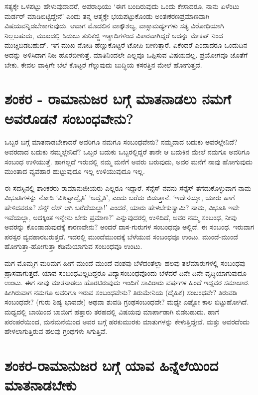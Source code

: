 ಸತ್ಯಕ್ಕೇ ಒಳಪಟ್ಟು ಹೇಳುವುದಾದರೆ, ಅಪರಾಧಿಯು `ಈಗ ಬಂದಿರುವುದು ಒಂದು ಕೇಸಾದರೂ, ನಾನು ಏಳೆಂಟು ಮರ್ಡರ್ ಮಾಡಿಬಿಟ್ಟಿದ್ದೇನೆ' ಎಂದು ತನ್ನ ಆತ್ಮಕ್ಕೇ ಭಯಪಟ್ಟುಕೊಂಡು ಅಂತಃಕರಣಪ್ರಮಾಣವಾಗಿ ವಿಷಯವನ್ನಿಡಬೇಕಾಗುವುದು. ಆವಾಗ ಮೊದಲಿನ ವಾಕ್ಕೌಶಲ್ಯ, ವಾಕ್ಸಾಮರ್ಥ್ಯಗಳು ಸತ್ಯ ವಿರೋಧಿಯಾಗಿ ನಿಲ್ಲಬಹುದು, ಮುಖದಲ್ಲಿ ಸಿಡುಬು ತುರಿಕಜ್ಜಿ ಇತ್ಯಾದಿಗಳಿಂದ ವಿಕಾರವಾಗಿದ್ದರೆ ಅದನ್ನು ಮೇಕಪ್ ನಿಂದ ಮುಚ್ಚಿಬಿಡಬಹುದ್. ಇಗ ಮುಖ ನೋಡಿ ಹೆಣ್ಣುಕೊಟ್ಟರೆ ಟೋಪಿ ಬೀಳುತ್ತಾರೆ. ಏಕೆಂದರೆ ಎಂದಾದರೂ ಒಂದುದಿನ ಅದನ್ನು ಅಳಿಸಿದಾಗ ನಿಜ ಹೊರಬೀಳುತ್ತೆ. ಮಾತಿನಿಂದಲೇ ಎಲ್ಲವೂ ಒಪ್ಪಿಸುವ ವಿಷಯವಲ್ಲ. ಪ್ರಯೋಗವೂ ಜೊತೆಗೆ ಬೇಕು. ಕೇವಲ ವಾಕ್ಕಿಗೇ ಬೆಲೆ ಕೊಟ್ಟರೆ ಗೆಲ್ಲುವುದು ಬುದ್ಧಿಯ ಕಸರತ್ತಿನ ಮೇಲೆ ಹೋಗುತ್ತದೆ.

\section*{ಶಂಕರ - ರಾಮಾನುಜರ ಬಗ್ಗೆ ಮಾತನಾಡಲು ನಮಗೆ ಅವರೊಡನೆ ಸಂಬಂಧವೇನು?}

ಒಬ್ಬರ ಬಗ್ಗೆ ಮಾತನಾಡಬೇಕಾದರೆ ಅವರಿಗೂ ನಮಗೂ ಸಂಬಂಧವೇನು? ನಮ್ಮದಾದ ಬದುಕು ಅವರಲ್ಲೇನಿದೆ? ಅವರದಾದ ಬದುಕು ನಮ್ಮಲ್ಲೇನಿದೆ? ಒಬ್ಬರ ಬದುಕು ಒಬ್ಬರಲ್ಲಿದ್ದರೆ ತಾನೇ ಆ ಬದುಕಿನ ಮೇಲೆ ನಮಗೂ ಅವರಿಗೂ ಸಂಬಂಧ ಉಳಿಯುತ್ತೆ. ಹಾಗಲ್ಲದೆ ಇರುವಲ್ಲಿ ನಮ್ಮ ಮನೆಗೆ ಅವರು ಬರುವುದು, ಅವರ ಮನೆಗೆ ನಾವು ಹೋಗುವುದು ಮುಂತಾದ ವ್ಯವಹಾರ ಹುಟ್ಟುವುದೂ ಇಲ್ಲ ಉಳಿಯುವುದೂ ಇಲ್ಲ.

ಈ ಸದಸ್ಸಿನಲ್ಲಿ ಶಾಂಕರರು ರಾಮಾನುಜೀಯರು ಎಲ್ಲರೂ ಇದ್ದಾರೆ. ಸೆನ್ಸೆಸ್ ನವನು ಸೆನ್ಸೆಸ್ ತೆಗೆದುಕೊಳ್ಳುವಾಗ ನಾಮ ವಿಭೂತಿಗಳನ್ನು ನೋಡಿ `ವಿಶಿಷ್ಟಾದ್ವೈತಿ' `ಅದ್ವೈತಿ', ಎಂದು ಬರೆದು ಬಿಡುತ್ತಾನೆ. `ಇದೇನಯ್ಯಾ, ಯಾರು ಹಾಗೆ ಹೇಳಿದವರೂ? ಸೆನ್ಸ್ ಲೆಸ್ ಆಗಿ ಬರೆದೆಯಲ್ಲಾ!' ಎಂದರೆ, ಯಾರು ಹೇಳಬೇಕುಸ್ವಾಮಿ? ನಾಮ, ವಿಭೂತಿ ಇವೇ ಇವೆಯಲ್ಲಾ, ಅದಕ್ಕಿಂತ ಇನ್ನೇನು ಬೇಕು ಪ್ರಮಾಣ?' ಎನ್ನುವುದರಲ್ಲಿ ಉಳಿದಿದೆ, ಅವರ ನಮ್ಮ ಸಂಬಂಧ, ನೀವು ಅವರನ್ನು ಕೊಂಡಾಡುವುದಕ್ಕೆ  ಕಾರಣವೇನು? ಅಂದರೆ ದಾಸ-ಗುರುಗಳ ಸಂಬಂಧವೂ ಅಲ್ಲಿದೆ. ಈ ಸಂಬಂಧ. ಇರುವಾಗ ಪರಸ್ಪರ ವ್ಯವಹಾರಬರುತ್ತದೆ. ಇದರಲ್ಲಿ ಮುಂದೆಮುಂದಕ್ಕೆ ಬೆಳೆಯುವ ಸಂಬಂಧವೂ ಉಂಟು. ಮುಂದೆ-ಮುಂದೆ ಹೋಗುತ್ತಾ-ಹೋಗುತ್ತಾ ಕಡಿಮೆಯಾಗುವ ಸಂಬಂಧವೂ ಉಂಟು.

ಮಗ ಮೊಮ್ಮಗ ಮರಿಮಗ ಹೀಗೆ ಮುಂದೆ ಮುಂದೆ ವಂಶವು ಬೆಳೆದಂತೆಲ್ಲಾ ಹಲವು ತಲೆಮಾರುಗಳಲ್ಲಿ ಸಂಬಂಧವು ಹ್ರಾಸವಾಗುತ್ತದೆ. ಯಾವ ಸಂಬಂಧವಿಲ್ಲದಿದ್ದರೂ ವಿದ್ಯಾಸಂಬಂಧವೊಂದು ಬೆಳೆದರೆ ದಿನೇ ದಿನೇ ವೃದ್ಧಿಯಾಗುವುದೂ ಉಂಟು. ಈಗ ನಾವು ಮಾತನಾಡಲು ಹೊರಟಿರುವುದು ಇಂದಿಗೆ ಸಾವಿರಾರು ವರ್ಷಗಳ ಹಿಂದೆ ಇದ್ದವರ ಸಮಾಚಾರ. ಹೀಗಿರುವಾಗ ನಮಗೂ ಅವರಿಗೂ ಇರುವ ಸಂಬಂಧವೇನು? ತಿರುಮೇನಿಯ (ದೈಹಿಕ) ಸಂಬಂಧವೇ? ತಿರುವಡಿ ಸಂಬಂಧವೇ? (ಗುರು ಶಿಷ್ಯ ಭಾವವೇ) ಅಥವಾ ಶುವಡಿ ಗ್ರಂಥಸಂಬಂಧವೇ? ಮಧ್ಯೇ ಎಷ್ಟೋ ಕಾಲ ಬಿಟ್ಟುಹೋಗಿದೆ. ಮಧ್ಯದಲ್ಲಿ ಬಾಯಿಂದ ಬಾಯಿಗೆ ಹತ್ತಾರು ತರಹದಲ್ಲಿ ವಿಷಯವು ಮಾರ್ಪಾಡಾಗಿ ಬಿಡಬಹುದು. ಹಾಗೆ ಪರಂಪರೆಯಿಂದ, ಮನೆಮನೆಯಿಂದ ಅವರ ಬಗ್ಗೆ ಹರಕುಮುರಕು ಮಾತುಗಳನ್ನು  ಕೇಳುತ್ತಿದ್ದೇವೆ. ಮತ್ತು ಅವರದೆಂದು ಹೇಳಲಾಗುತ್ತಿರುವ ಹಲವು ಗ್ರಂಥಗಳು ಸಿಗುತ್ತಿವೆ.

\section*{ಶಂಕರ-ರಾಮಾನುಜರ ಬಗ್ಗೆ  ಯಾವ ಹಿನ್ನೆಲೆಯಿಂದ ಮಾತನಾಡಬೇಕು}

